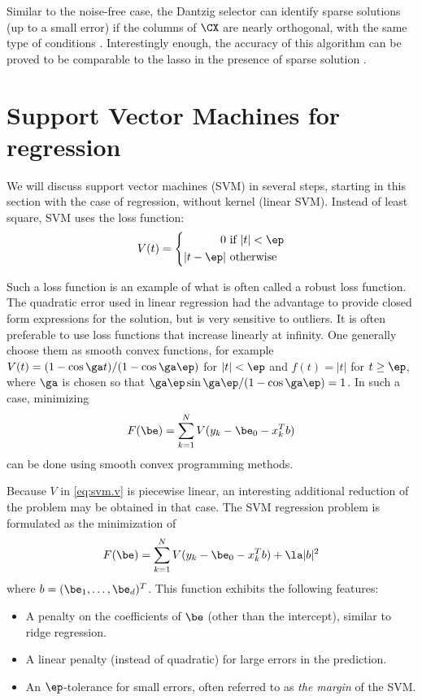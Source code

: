 Similar to the noise-free case, the Dantzig selector can identify sparse
solutions (up to a small error) if the columns of $\CX$ are nearly orthogonal, with the same
type of conditions \cite{ct07}. Interestingly enough, the accuracy of
this algorithm can be proved to be comparable to the lasso in the
presence of sparse solution \cite{brt08}.

\section{Support Vector Machines for regression}

We will discuss support vector machines (SVM) in several steps, starting in
this section with the case of regression, without kernel (linear
SVM). Instead of least square, SVM uses the  loss function:
\begin{equation}
\label{eq:svm.v}
V(t) = \left\{
\begin{aligned}
 0 & \text{ if } |t| < \ep\\ 
 |t-\ep| &
\text{ otherwise}\end{aligned}\right.
\end{equation}


Such a loss function is an example of what is often called a robust
loss function. The quadratic error used in linear regression had the
advantage to provide closed form expressions for the solution, but is
very sensitive to outliers. It is often preferable to use loss
functions that increase linearly at infinity. One generally choose
them as smooth convex functions, for example $V(t) = (1-\cos\ga
t)/(1-\cos\ga\ep)$ for $|t|<\ep$ and $f(t) = |t|$ for $t \geq \ep$,
where $\ga$ is chosen so that $\ga\ep\sin\ga\ep /(1-\cos\ga\ep) =
1$. In such a case, minimizing
$$
F(\be) = \sum_{k=1}^N V(y_k - \be_0 - x_k^T b)
$$
can be done using smooth convex programming methods. 

Because $V$ in \eqref{eq:svm.v} is piecewise linear, an interesting
additional reduction of the problem may be obtained in that case. The SVM regression problem is formulated as the minimization of
$$ 
F(\be) = \sum_{k=1}^N V(y_k - \be_0 - x_k^T b) + \la |b|^2
$$
where $b = (\be_1, \ldots, \be_d)^T$. This function exhibits the
following features:
\begin{itemize}
\item A penalty on the coefficients of $\be$ (other than the
intercept), similar to ridge regression.
\item A linear penalty (instead of quadratic) for large errors in the
prediction.
\item An $\ep$-tolerance for small errors, often referred to as {\em the margin} of the SVM.
\end{itemize}

